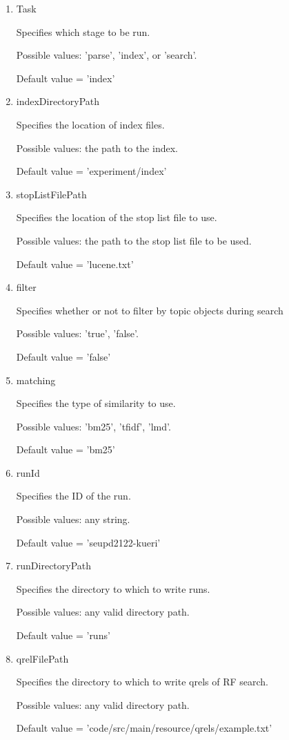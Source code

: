    \begin{enumerate}
        \item Task
            
            Specifies which stage to be run.
            
            Possible values: 'parse', 'index', or 'search'.
    
            Default value = 'index'
        \item indexDirectoryPath
            
            Specifies the location of index files.
            
            Possible values: the path to the index.
            
            Default value = 'experiment/index'
            
        \item stopListFilePath
            
            Specifies the location of the stop list file to use.
        
            Possible values: the path to the stop list file to be used.
            
            Default value = 'lucene.txt'
        \item filter
            
            Specifies whether or not to filter by topic objects during search
            
            Possible values: 'true', 'false'.
            
            Default value = 'false'
        \item matching
            
            Specifies the type of similarity to use.
            
            Possible values: 'bm25', 'tfidf', 'lmd'.
            
            Default value = 'bm25'
        \item runId
            
            Specifies the ID of the run.
            
            Possible values: any string.
            
            Default value = 'seupd2122-kueri'
        \item runDirectoryPath
            
            Specifies the directory  to which to write runs.
            
            Possible values: any valid directory path.
            
            Default value = 'runs'
        \item qrelFilePath
            
            Specifies the directory to which to write qrels of RF search.
            
            Possible values: any valid directory path.
            
            Default value = 'code/src/main/resource/qrels/example.txt'

\end{enumerate}
